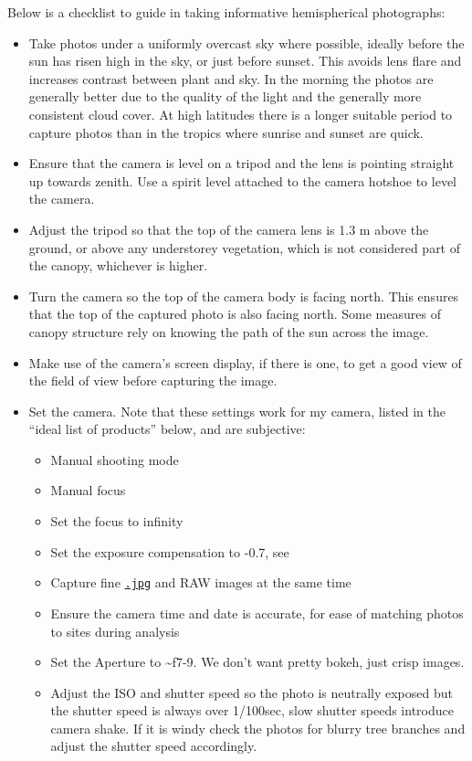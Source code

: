 \documentclass[11pt,a4paper]{article}
\newcommand\file[1]{\texttt{\underline{#1}}}  %
\begin{document}
Below is a checklist to guide in taking informative hemispherical photographs: 

\begin{itemize}
	\item{Take photos under a uniformly overcast sky where possible, ideally before the sun has risen high in the sky, or just before sunset. This avoids lens flare and increases contrast between plant and sky. In the morning the photos are generally better due to the quality of the light and the generally more consistent cloud cover. At high latitudes there is a longer suitable period to capture photos than in the tropics where sunrise and sunset are quick.}
	\item{Ensure that the camera is level on a tripod and the lens is pointing straight up towards zenith. Use a spirit level attached to the camera hotshoe to level the camera.}
	\item{Adjust the tripod so that the top of the camera lens is 1.3 m above the ground, or above any understorey vegetation, which is not considered part of the canopy, whichever is higher.} 
	\item{Turn the camera so the top of the camera body is facing north. This ensures that the top of the captured photo is also facing north. Some measures of canopy structure rely on knowing the path of the sun across the image.}
	\item{Make use of the camera's screen display, if there is one, to get a good view of the field of view before capturing the image.}
	\item{Set the camera. Note that these settings work for my camera, listed in the  
		``ideal list of products'' below, and are subjective:}
		\begin{itemize}
			\item{Manual shooting mode}
			\item{Manual focus}
			\item{Set the focus to infinity}
			\item{Set the exposure compensation to -0.7, see \citet{Zhang2005}}
			\item{Capture fine \file{.jpg} and RAW images at the same time}
			\item{Ensure the camera time and date is accurate, for ease of matching photos to sites during analysis}
			\item{Set the Aperture to \textasciitilde{}f7-9. We don't want pretty bokeh, just crisp images.}
			\item{Adjust the ISO and shutter speed so the photo is neutrally exposed but the shutter speed is always over 1/100sec, slow shutter speeds introduce camera shake. If it is windy check the photos for blurry tree branches and adjust the shutter speed accordingly.}

\end{itemize}
\end{itemize}
\end{document}
